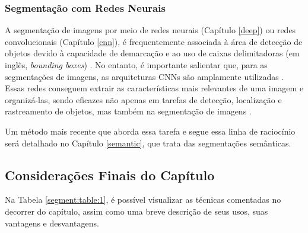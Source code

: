 \subsubsection{Segmentação com Redes Neurais}
\label{segment:neural}

A segmentação de imagens por meio de redes neurais (Capítulo \ref{deep}) ou redes convolucionais (Capítulo \ref{cnn}), é frequentemente associada à área de detecção de objetos devido à capacidade de demarcação e ao uso de caixas delimitadoras (em inglês, \textit{bounding boxes}) \citep{Ghosh2019}. No entanto, é importante salientar que, para as segmentações de imagens, as arquiteturas CNNs são amplamente utilizadas \citep{Goncalves2021}. Essas redes conseguem extrair as características mais relevantes de uma imagem e organizá-las, sendo eficazes não apenas em tarefas de detecção, localização e rastreamento de objetos, mas também na segmentação de imagens \citep{Ghosh2019}.

Um método mais recente que aborda essa tarefa e segue essa linha de raciocínio será detalhado no Capítulo \ref{semantic}, que trata das segmentações semânticas.

\subsection{Considerações Finais do Capítulo}
\label{segment:conclusion}

Na Tabela \ref{segment:table:1}, é possível visualizar as técnicas comentadas no decorrer do capítulo, assim como uma breve descrição de seus usos, suas vantagens e desvantagens.

